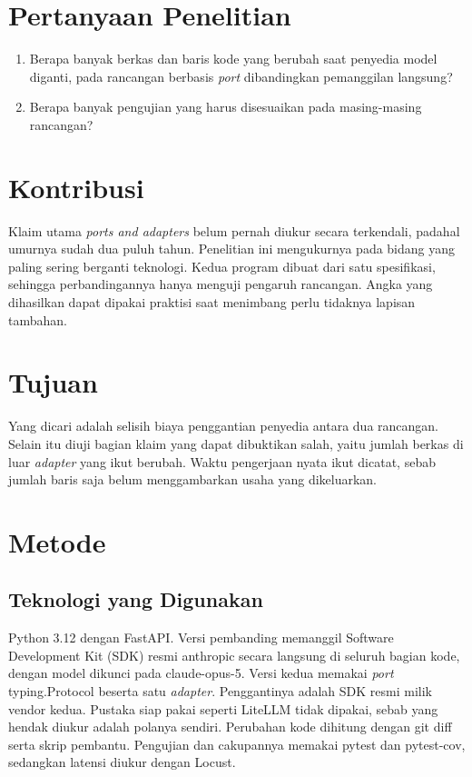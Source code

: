 \documentclass[11pt,a4paper]{article}
\begin{document}
\section{Pertanyaan Penelitian}

\begin{enumerate}[label=\textbf{Pertanyaan \arabic*.}, leftmargin=*, labelsep=0.5em]
  \item Berapa banyak berkas dan baris kode yang berubah saat penyedia model diganti, pada rancangan berbasis \textit{port} dibandingkan pemanggilan langsung?
  \item Berapa banyak pengujian yang harus disesuaikan pada masing-masing rancangan?
\end{enumerate}

\section{Kontribusi}

Klaim utama \textit{ports and adapters} belum pernah diukur secara terkendali, padahal umurnya sudah dua puluh tahun. Penelitian ini mengukurnya pada bidang yang paling sering berganti teknologi. Kedua program dibuat dari satu spesifikasi, sehingga perbandingannya hanya menguji pengaruh rancangan. Angka yang dihasilkan dapat dipakai praktisi saat menimbang perlu tidaknya lapisan tambahan.

\section{Tujuan}

Yang dicari adalah selisih biaya penggantian penyedia antara dua rancangan. Selain itu diuji bagian klaim yang dapat dibuktikan salah, yaitu jumlah berkas di luar \textit{adapter} yang ikut berubah. Waktu pengerjaan nyata ikut dicatat, sebab jumlah baris saja belum menggambarkan usaha yang dikeluarkan.

\section{Metode}

\subsection{Teknologi yang Digunakan}

Python 3.12 dengan FastAPI. Versi pembanding memanggil Software Development Kit (SDK) resmi anthropic secara langsung di seluruh bagian kode, dengan model dikunci pada claude-opus-5. Versi kedua memakai \textit{port} typing.Protocol beserta satu \textit{adapter}. Penggantinya adalah SDK resmi milik vendor kedua. Pustaka siap pakai seperti LiteLLM tidak dipakai, sebab yang hendak diukur adalah polanya sendiri. Perubahan kode dihitung dengan git diff serta skrip pembantu. Pengujian dan cakupannya memakai pytest dan pytest-cov, sedangkan latensi diukur dengan Locust.
\end{document}

